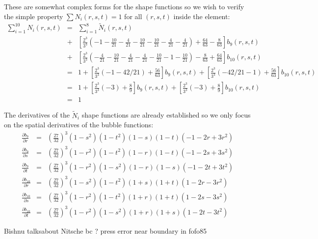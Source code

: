 These are somewhat complex forms for the shape functions so we wish to verify the simple property $\sum N_i(r,s,t) =1$ for all $(r,s,t)$ inside the element:
\begin{eqnarray}
\sum_{i=1}^{10} N_i(r,s,t)  
&=& \sum_{i=1}^{8} \tilde{N}_i(r,s,t) \nonumber\\
&+& \left[\frac{2^3}{3^3} \left(-1 -\frac{10}{21} -\frac{4}{21} -\frac{10}{21} -\frac{10}{21} -\frac{4}{21} -\frac{4}{21}\right) + \frac{64}{63} -\frac{8}{63} \right] b_9(r,s,t) \nonumber\\
&+& \left[\frac{2^3}{3^3} \left(-\frac{4}{21} -\frac{10}{21} -\frac{4}{21} -\frac{4}{21} -\frac{10}{21} -1 -\frac{10}{21} \right) -\frac{8}{63} + \frac{64}{63} \right] b_{10}(r,s,t) \nonumber\\
&=& 1 + \left[\frac{2^3}{3^3} (-1 -42/21) +\frac{56}{63}  \right] b_9(r,s,t) 
+ \left[\frac{2^3}{3^3} (-42/21 -1)  + \frac{56}{63} \right] b_{10}(r,s,t) \nonumber\\
&=& 1 + \left[\frac{2^3}{3^3} (-3) + \frac{8}{9} \right] b_9(r,s,t) 
+ \left[\frac{2^3}{3^3} (-3)  + \frac{8}{9} \right] b_{10}(r,s,t) \nonumber\\
&=& 1
\end{eqnarray}

The derivatives of the $\tilde{N}_i$ shape functions are already established so we only focus on the spatial derivatives of the bubble functions:
\begin{eqnarray}
\frac{\partial b_9}{\partial r} 
&=& \left(\frac{27}{32}\right)^3 (1-s^2)(1-t^2) (1-s)(1-t) (-1-2r+3r^2  )\nonumber\\
\frac{\partial b_9}{\partial s}
&=& \left(\frac{27}{32}\right)^3 (1-r^2)(1-t^2) (1-r)(1-t) (-1-2s+3s^2  )\nonumber\\
\frac{\partial b_9}{\partial t}
&=& \left(\frac{27}{32}\right)^3 (1-r^2)(1-s^2) (1-r)(1-s) (-1-2t+3t^2  )\nonumber\\
\frac{\partial b_{10}}{\partial r} 
&=& \left(\frac{27}{32}\right)^3 (1-s^2)(1-t^2) (1+s)(1+t) (1-2r-3r^2  )\nonumber\\
\frac{\partial b_{10}}{\partial s}
&=& \left(\frac{27}{32}\right)^3 (1-r^2)(1-t^2) (1+r)(1+t) (1-2s-3s^2  )\nonumber\\
\frac{\partial b_{10}}{\partial t} 
&=& \left(\frac{27}{32}\right)^3 (1-r^2)(1-s^2) (1+r)(1+s) (1-2t-3t^2  ) \nonumber
\end{eqnarray}





\Literature \cite{fofo85,sofo87}

Bishnu talksabout Nitsche bc ? press error near boundary in fofo85

